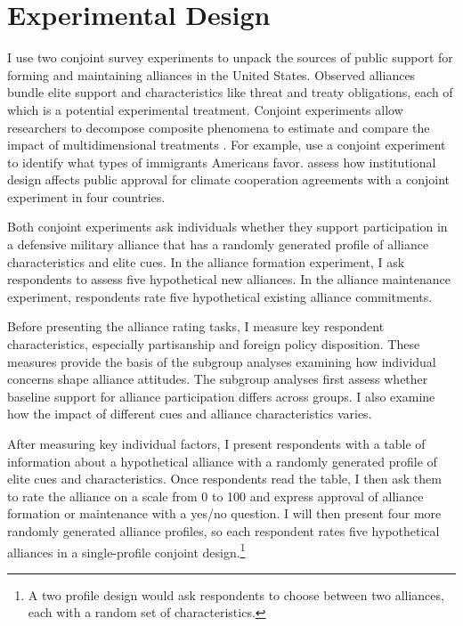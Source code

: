 \documentclass[12pt]{article}
\begin{document}
\section{Experimental Design}


I use two conjoint survey experiments to unpack the sources of public support for forming and maintaining alliances in the United States. 
Observed alliances bundle elite support and characteristics like threat and treaty obligations, each of which is a potential experimental treatment.  
Conjoint experiments allow researchers to decompose composite phenomena to estimate and compare the impact of multidimensional treatments \citep{Hainmuelleretal2014}. 
For example, \citet{HainmuellerHopkins2015} use a conjoint experiment to identify what types of immigrants Americans favor. 
\citet{BechtelScheve2013} assess how institutional design affects public approval for climate cooperation agreements with a conjoint experiment in four countries. 


Both conjoint experiments ask individuals whether they support participation in a defensive military alliance that has a randomly generated profile of alliance characteristics and elite cues. 
In the alliance formation experiment, I ask respondents to assess five hypothetical new alliances. 
In the alliance maintenance experiment, respondents rate five hypothetical existing alliance commitments.


Before presenting the alliance rating tasks, I measure key respondent characteristics, especially partisanship and foreign policy disposition.  
These measures provide the basis of the subgroup analyses examining how individual concerns shape alliance attitudes. 
The subgroup analyses first assess whether baseline support for alliance participation differs across groups.
I also examine how the impact of different cues and alliance characteristics varies.


After measuring key individual factors, I present respondents with a table of information about a hypothetical alliance with a randomly generated profile of elite cues and characteristics.
Once respondents read the table, I then ask them to rate the alliance on a scale from 0 to 100 and express approval of alliance formation or maintenance with a yes/no question. 
I will then present four more randomly generated alliance profiles, so each respondent rates five hypothetical alliances in a single-profile conjoint design.\footnote{A two profile design would ask respondents to choose between two alliances, each with a random set of characteristics.} 
\end{document}
